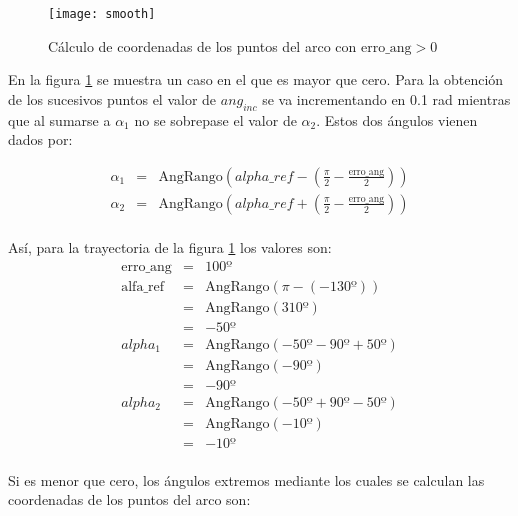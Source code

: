 \begin{figure}[bt]
  \centering\texttt{[image: smooth]}\\
  \caption{Cálculo de coordenadas de los puntos del arco con
  $\mbox{erro\_ang} > 0$}\label{fg:smooth}
\end{figure}

En la figura \ref{fg:smooth} se muestra un caso en el que  es mayor que cero. Para la obtención de los sucesivos puntos el valor de $ang_{inc}$ se va incrementando en 0.1 rad mientras que al sumarse a $\alpha_{1}$ no se sobrepase el valor de $\alpha_{2}$. Estos dos ángulos vienen dados por:

\begin{eqnarray*}
\alpha_{1}  & = & \mbox{AngRango} \left ( alpha\_ref -
   \left (\frac{\pi}{2} - \frac{\mbox{erro\_ang}}{2} \right ) \right )\\
 \alpha_{2}  & = & \mbox{AngRango} \left ( alpha\_ref +
   \left (\frac{\pi}{2} - \frac{\mbox{erro\_ang}}{2} \right ) \right )\\
\end{eqnarray*}

Así, para la trayectoria de la figura \ref{fg:smooth} los valores son:
\begin{eqnarray*}
\mbox{erro\_ang}  & = & 100º \\
\mbox{alfa\_ref}     &=  & \mbox{AngRango} (\pi - (-130º))\\
                                  & = &\mbox{AngRango} (310º) \\
                                  & = & -50º\\
alpha_{1}                &= & \mbox{AngRango} (-50º - 90º + 50º)\\
                                 & = & \mbox{AngRango} (-90º)\\
                                 & = & -90º\\
alpha_{2}                &= & \mbox{AngRango} (-50º + 90º - 50º)\\
                                 & = & \mbox{AngRango} (-10º)\\
                                 & = & -10º\\
\end{eqnarray*}



Si  es menor que cero, los ángulos extremos mediante los cuales se calculan las coordenadas de los puntos del arco son:

